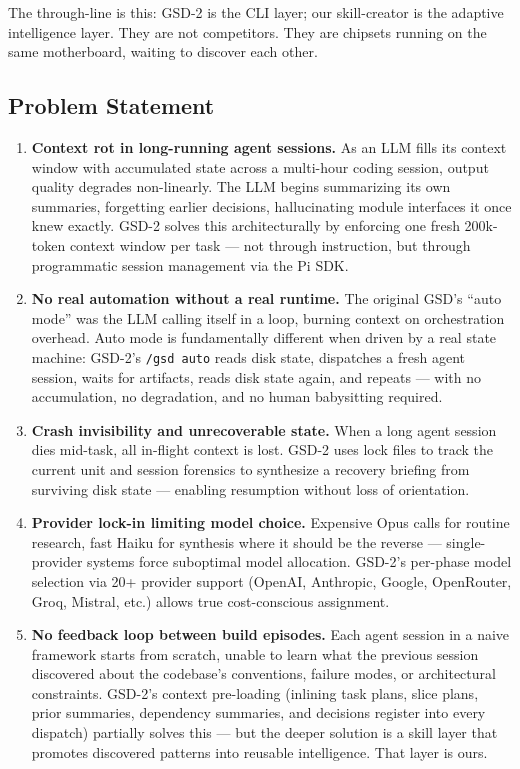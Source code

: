 \documentclass[11pt,letterpaper]{article}
\begin{document}
The through-line is this: GSD-2 is the CLI layer; our skill-creator is the adaptive intelligence layer. They are not competitors. They are chipsets running on the same motherboard, waiting to discover each other.

\subsection{Problem Statement}

\begin{enumerate}
  \item \textbf{Context rot in long-running agent sessions.} As an LLM fills its context window with accumulated state across a multi-hour coding session, output quality degrades non-linearly. The LLM begins summarizing its own summaries, forgetting earlier decisions, hallucinating module interfaces it once knew exactly. GSD-2 solves this architecturally by enforcing one fresh 200k-token context window per task --- not through instruction, but through programmatic session management via the Pi SDK.

  \item \textbf{No real automation without a real runtime.} The original GSD's ``auto mode'' was the LLM calling itself in a loop, burning context on orchestration overhead. Auto mode is fundamentally different when driven by a real state machine: GSD-2's \texttt{/gsd auto} reads disk state, dispatches a fresh agent session, waits for artifacts, reads disk state again, and repeats --- with no accumulation, no degradation, and no human babysitting required.

  \item \textbf{Crash invisibility and unrecoverable state.} When a long agent session dies mid-task, all in-flight context is lost. GSD-2 uses lock files to track the current unit and session forensics to synthesize a recovery briefing from surviving disk state --- enabling resumption without loss of orientation.

  \item \textbf{Provider lock-in limiting model choice.} Expensive Opus calls for routine research, fast Haiku for synthesis where it should be the reverse --- single-provider systems force suboptimal model allocation. GSD-2's per-phase model selection via 20+ provider support (OpenAI, Anthropic, Google, OpenRouter, Groq, Mistral, etc.) allows true cost-conscious assignment.

  \item \textbf{No feedback loop between build episodes.} Each agent session in a naive framework starts from scratch, unable to learn what the previous session discovered about the codebase's conventions, failure modes, or architectural constraints. GSD-2's context pre-loading (inlining task plans, slice plans, prior summaries, dependency summaries, and decisions register into every dispatch) partially solves this --- but the deeper solution is a skill layer that promotes discovered patterns into reusable intelligence. That layer is ours.
\end{enumerate}
\end{document}
